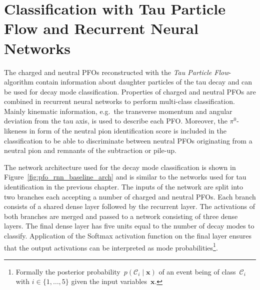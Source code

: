 \section{Classification with Tau Particle Flow and Recurrent Neural Networks}
\label{sec:pfo_general}

The charged and neutral PFOs reconstructed with the \emph{Tau Particle
  Flow}-algorithm contain information about daughter particles of the tau decay
and can be used for decay mode classification. Properties of charged and neutral
PFOs are combined in recurrent neural networks to perform multi-class
classification. Mainly kinematic information, e.g.\ the transverse momentum and
angular deviation from the tau axis, is used to describe each PFO. Moreover, the
$\pi^0$-likeness in form of the neutral pion identification score is included in
the classification to be able to discriminate between neutral PFOs originating
from a neutral pion and remnants of the subtraction or pile-up.

The network architecture used for the decay mode classification is shown in
Figure~\ref{fig:pfo_rnn_baseline_arch} and is similar to the networks used for
tau identification in the previous chapter. The inputs of the network are split
into two branches each accepting a number of charged and neutral PFOs. Each
branch consists of a shared dense layer followed by the recurrent layer. The
activations of both branches are merged and passed to a network consisting of
three dense layers. The final dense layer has five units equal to the number of
decay modes to classify. Application of the Softmax activation function on the
final layer ensures that the output activations can be interpreted as mode
probabilities\footnote{Formally the posterior
  probability~$p(\mathcal{C}_i \mid \mathbf{x})$ of an event being of
  class~$\mathcal{C}_i$ with $i \in \{1, \dots, 5 \}$ given the input
  variables~$\mathbf{x}$.}.

